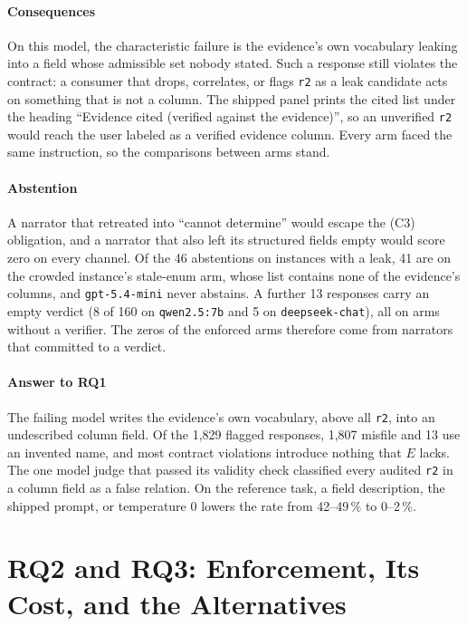 \documentclass[journal]{IEEEtran}
\begin{document}
\paragraph{Consequences}
On this model, the characteristic failure is the evidence's own vocabulary
leaking into a field whose admissible set nobody stated. Such a response still
violates the contract: a consumer that drops, correlates, or flags \texttt{r2}
as a leak candidate acts on something that is not a column. The shipped panel
prints the cited list under the heading ``Evidence cited (verified against the
evidence)'', so an unverified \texttt{r2} would reach the user labeled as
a verified evidence column. Every arm faced the same instruction, so the
comparisons between arms stand.

\paragraph{Abstention}
A narrator that retreated into ``cannot determine'' would escape the (C3)
obligation, and a narrator that also left its structured fields empty would
score zero on every channel. Of the 46 abstentions on instances with a leak,
41 are on the crowded instance's stale-enum arm, whose list contains none of
the evidence's columns, and \texttt{gpt-5.4-mini} never abstains. A further 13
responses carry an empty verdict (8 of 160 on \texttt{qwen2.5:7b} and 5 on
\texttt{deepseek-chat}), all on arms without a verifier. The zeros of the
enforced arms therefore come from narrators that committed to a verdict.

\paragraph{Answer to RQ1}
The failing model writes the evidence's own vocabulary, above all
\texttt{r2}, into an undescribed column field. Of the 1{,}829 flagged
responses, 1{,}807 misfile and 13 use an invented name, and most contract
violations introduce nothing that $E$ lacks. The one model judge that passed its
validity check classified every audited \texttt{r2} in a column field as a
false relation. On the reference task, a field description, the
shipped prompt, or temperature 0 lowers the rate from 42--49\,\% to
0--2\,\%.

\section{RQ2 and RQ3: Enforcement, Its Cost, and the Alternatives}\label{sec:rq3}
\end{document}
